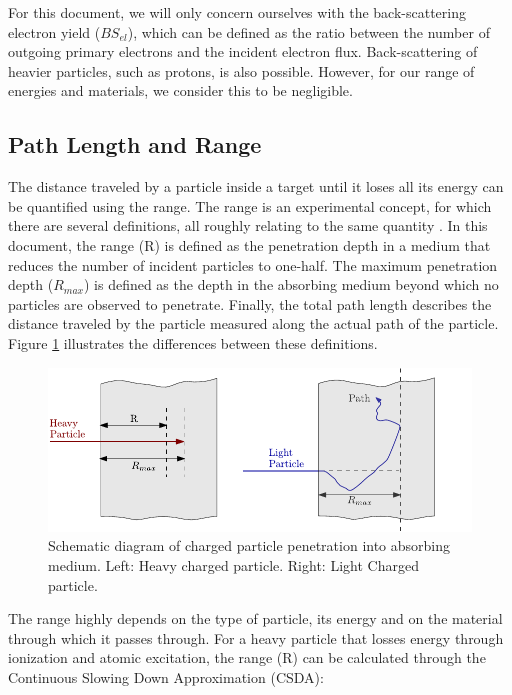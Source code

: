 For this document, we will only concern ourselves with the back-scattering electron yield ($BS_{el}$), which can be defined as the ratio between the number of outgoing primary electrons and the incident electron flux. Back-scattering of heavier particles, such as protons, is also possible. However, for our range of energies and materials, we consider this to be negligible.

\subsection{Path Length and Range}
\label{sec:Range}
The distance traveled by a particle inside a target until it loses all its energy can be quantified using the range. The range is an experimental concept, for which there are several definitions, all roughly relating to the same quantity \parencite*[][]{ref:Knoll}. In this document, the range (R) is defined as the penetration depth in a medium that reduces the number of incident particles to one-half. The maximum penetration depth ($R_{max}$) is defined as the depth in the absorbing medium beyond which no particles are observed to penetrate. Finally, the total path length describes the distance traveled by the particle measured along the actual path of the particle. Figure \ref{fig:RangeVsPathLength} illustrates the differences between these definitions. 

\begin{figure}[h]
    \centering
    \includegraphics[width=0.9\columnwidth]{RangeVsPath/RangeVsPath.pdf}
    \caption{Schematic diagram of charged particle penetration into absorbing medium. Left: Heavy charged particle. Right: Light Charged particle.}
    \label{fig:RangeVsPathLength}
\end{figure}

The range highly depends on the type of particle, its energy and on the material through which it passes through. For a heavy particle that losses energy through ionization and atomic excitation, the range (R) can be calculated through the Continuous Slowing Down Approximation (CSDA): 

